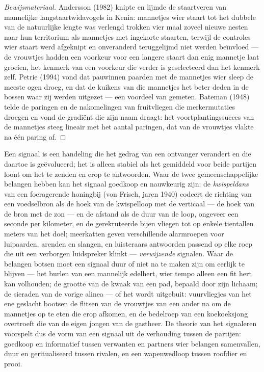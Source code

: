 \begin{proof}[Bewijsmateriaal]
Andersson (1982) knipte en lijmde de staartveren van mannelijke
langstaartwidavogels in Kenia: mannetjes wier staart tot het dubbele
van de natuurlijke lengte was verlengd trokken vier maal zoveel nieuwe
nesten naar hun territorium als mannetjes met ingekorte staarten,
terwijl de controles wier staart werd afgeknipt en onveranderd
teruggelijmd niet werden beïnvloed --- de vrouwtjes hadden een voorkeur
voor een langere staart dan enig mannetje laat groeien, het kenmerk van
een voorkeur die verder is geselecteerd dan het kenmerk zelf. Petrie
(1994) vond dat pauwinnen paarden met de mannetjes wier sleep de meeste
ogen droeg, en dat de kuikens van die mannetjes het beter deden in de
bossen waar zij werden uitgezet --- een voordeel van 
gemeten. Bateman (1948) telde de paringen en de nakomelingen van
fruitvliegen die merkermutaties droegen en vond de gradiënt die zijn
naam draagt: het voortplantingssucces van de mannetjes steeg lineair
met het aantal paringen, dat van de vrouwtjes vlakte na één paring af.
\end{proof}

\begin{proposition}\label{prop:b3:behavioural-ecology:signals}
Een signaal is een handeling die het gedrag van een ontvanger verandert
en die daartoe is geëvolueerd; het is alleen stabiel als het gemiddeld
voor beide partijen loont om het te zenden en erop te antwoorden. Waar
de twee gemeenschappelijke belangen hebben kan het signaal goedkoop en
nauwkeurig zijn: de \emph{kwispeldans} van een foeragerende honingbij
(von Frisch, jaren 1940) codeert de richting van een voedselbron als de
hoek van de kwispelloop met de verticaal --- de hoek van de bron met de
zon --- en de afstand als de duur van de loop, ongeveer een seconde per
kilometer, en de gerekruteerde bijen vliegen tot op enkele tientallen
meters van het doel; meerkatten geven verschillende alarmroepen voor
luipaarden, arenden en slangen, en luisteraars antwoorden passend op
elke roep die uit een verborgen luidspreker klinkt ---
\emph{verwijzende} signalen. Waar de belangen botsen moet een signaal
duur of niet na te maken zijn om eerlijk te blijven --- het burlen van
een mannelijk edelhert, wier tempo alleen een fit hert kan volhouden;
de grootte van de kwaak van een pad, bepaald door zijn lichaam; de
sieraden van de vorige alinea --- of het wordt uitgebuit: vuurvliegjes
van het ene geslacht bootsen de flitsen van de vrouwtjes van een ander
na om de mannetjes op te eten die erop afkomen, en de bedelroep van een
koekoeksjong overtroeft die van de eigen jongen van de gastheer. De
theorie van het signaleren voorspelt dus de vorm van een signaal uit de
verhouding tussen de partijen: goedkoop en informatief tussen verwanten
en partners wier belangen samenvallen, duur en geritualiseerd tussen
rivalen, en een wapenwedloop tussen roofdier en prooi.
\end{proposition}
\admitted

